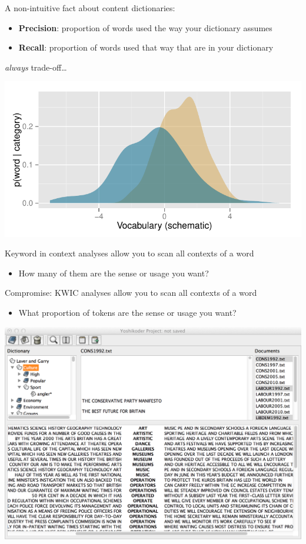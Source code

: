 \documentclass[11pt,compress,professionalfonts]{beamer}
\newcommand{\ita}{\begin{itemize}}
\newcommand{\itm}{\item[]}
\newcommand{\itz}{\end{itemize}}
\begin{document}

A non-intuitive fact about content dictionaries:
\ita
\itm \textbf{Precision}: proportion of words used the way your dictionary assumes
\itm \textbf{Recall}: proportion of words used that way that are in your dictionary
\itz
\textit{always} trade-off\ldots 


\centerline{\includegraphics[scale=1.7]{pictures/schematic-vocab}}


Keyword in context analyses allow you to scan all contexts of a word
\ita
\itm How many of them are the sense or usage you want?
\itz

Compromise: KWIC analyses allow you to scan all contexts of a word
\ita
\itm What proportion of tokens are the sense or usage you want?
\itz

\newpage

\centerline{\includegraphics[scale=.7]{pictures/yk-measurement-error}}
\end{document}

